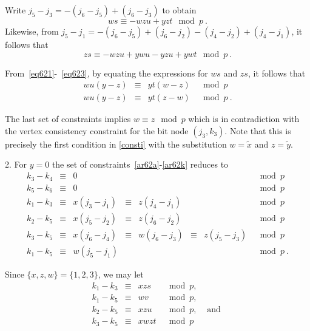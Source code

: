 Write $j_5-j_3=-(j_6-j_5)+(j_6-j_3)$ to obtain
\begin{equation}\label{eq622}
ws \equiv -wzu +yzt \mod p~.
\end{equation}
Likewise, from $j_5-j_1=-(j_6-j_5)+(j_6-j_2)-(j_4-j_2)+(j_4-j_1)$,
it follows that
\begin{equation}\label{eq623}
zs \equiv -wzu +ywu -yzu +ywt \mod p~.
\end{equation}

From~\eqref{eq621}-~\eqref{eq623}, by equating the expressions for
$ws$ and $zs$, it follows that
\begin{equation}\begin{array}{cccc}
wu(y-z) &\equiv &yt(w-z) &\mod p \\
wu(y-z) &\equiv &yt(z-w) &\mod p~.
\end{array}\end{equation}

The last set of constraints implies $w\equiv z \mod p$ which is in
contradiction with the vertex consistency constraint for the bit
node $(j_3,k_3)$. Note that this is precisely the first condition
in \eqref{consti} with the substitution $w=\tilde{x}$ and
$z=\tilde{y}$.

2. For $y=0$ the set of constraints~\eqref{ar62a}-\eqref{ar62k}
reduces to
\begin{equation}\begin{array}{cccccccccc}
k_3-k_4 &\equiv& 0 & {}& {}&{}&{}&\mod p
\\
k_5-k_6 &\equiv& 0 & {}& {}&{}&{}&\mod p\\
k_1-k_3 &\equiv& x(j_3-j_1)& \equiv& z(j_4-j_1)& {} &{}&\mod p
\\
k_2-k_5 &\equiv& x(j_5-j_2) &\equiv&  z(j_6-j_2) &{}&{} &\mod
p\\
k_3-k_5 &\equiv& x(j_6-j_4) &\equiv& w(j_6-j_3) &
\equiv& z(j_5-j_3)&\mod p\\
k_1-k_5 &\equiv& w(j_5-j_1) & {} & {} &{}&{}&\mod p~.
\end{array}\end{equation}

Since $\{x,z,w\}=\{1,2,3\}$, we may let
\begin{equation}\begin{array}{ccccc}k_1-k_3 &\equiv& xzs &\mod p, &{} \\
k_1-k_5 &\equiv & wv &\mod p, &{}\\ k_2-k_5 &\equiv& xzu &\mod p,
&\text{ and }\\k_3-k_5 &\equiv& xwzt &\mod p&{}
\end{array}\end{equation}

